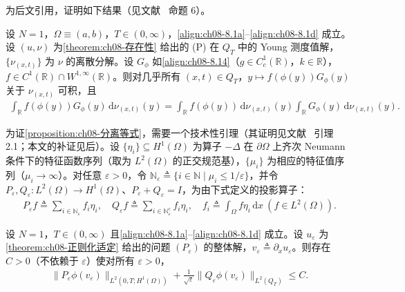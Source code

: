 \documentclass[../../main.tex]{subfiles}%
\begin{document}
为后文引用，证明如下结果（见文献~\cite{ref100} 命题 6）。

\begin{proposition}[测度分量的分离等式]\label{proposition:ch08-分离等式}
设 $N=1$，$\Omega\equiv(a,b)$，$T\in(0,\infty)$，\eqref{align:ch08-8.1a}--\eqref{align:ch08-8.1d} 成立。设 $(u,\nu)$ 为\cref{theorem:ch08-存在性} 给出的 (P) 在 $Q_T$ 中的 Young 测度值解，$\{\nu_{(x,t)}\}$ 为 $\nu$ 的离散分解。设 $G_\phi$ 如\eqref{align:ch08-8.14}（$g\in C^1_c(\mathbb{R})$，$k\in\mathbb{R}$），$f\in C^1(\mathbb{R})\cap W^{1,\infty}(\mathbb{R})$。则对几乎所有 $(x,t)\in Q_T$，$y\mapsto f(\phi(y))G_\phi(y)$ 关于 $\nu_{(x,t)}$ 可积，且
\begin{align}
\int_{\mathbb{R}}f(\phi(y))G_\phi(y)\,\mathrm{d}\nu_{(x,t)}(y)
=\int_{\mathbb{R}}f(\phi(y))\,\mathrm{d}\nu_{(x,t)}(y)\int_{\mathbb{R}}G_\phi(y)\,\mathrm{d}\nu_{(x,t)}(y). \label{align:ch08-8.58}
\end{align}
\end{proposition}

为证\cref{proposition:ch08-分离等式}，需要一个技术性引理（其证明见文献~\cite{ref83} 引理 2.1；本文的补证见后）。设 $\{\eta_i\}\subseteq H^1(\Omega)$ 为算子 $-\Delta$ 在 $\partial\Omega$ 上齐次 Neumann 条件下的特征函数序列（取为 $L^2(\Omega)$ 的正交规范基），$\{\mu_i\}$ 为相应的特征值序列（$\mu_i\to\infty$）。对任意 $\varepsilon>0$，令 $\mathbb{N}_\varepsilon\triangleq\{i\in\mathbb{N}\mid\mu_i\leqslant1/\varepsilon\}$，并令 $P_\varepsilon,Q_\varepsilon:L^2(\Omega)\to H^1(\Omega)$、$P_\varepsilon+Q_\varepsilon=I$，为由下式定义的投影算子：
\begin{align}
P_\varepsilon f\triangleq\sum_{i\in\mathbb{N}_\varepsilon}f_i\eta_i,\quad
Q_\varepsilon f\triangleq\sum_{i\in\mathbb{N}_\varepsilon^c}f_i\eta_i,\quad
f_i\triangleq\int_\Omega f\eta_i\,\mathrm{d}x\ (f\in L^2(\Omega)). \label{align:ch08-8.59}
\end{align}

\begin{lemma}[投影估计]\label{lemma:ch08-投影估计}
设 $N=1$，$T\in(0,\infty)$ 且\eqref{align:ch08-8.1a}--\eqref{align:ch08-8.1d} 成立。设 $u_\varepsilon$ 为\cref{theorem:ch08-正则化适定} 给出的问题 $(P_\varepsilon)$ 的整体解，$v_\varepsilon\triangleq\partial_xu_\varepsilon$。则存在 $C>0$（不依赖于 $\varepsilon$）使对所有 $\varepsilon>0$，
\begin{align}
\|P_\varepsilon\phi(v_\varepsilon)\|_{L^2(0,T;H^1(\Omega))}
+\frac{1}{\sqrt\varepsilon}\|Q_\varepsilon\phi(v_\varepsilon)\|_{L^2(Q_T)}\leqslant C. \label{align:ch08-8.60}
\end{align}
\end{lemma}
\end{document}
